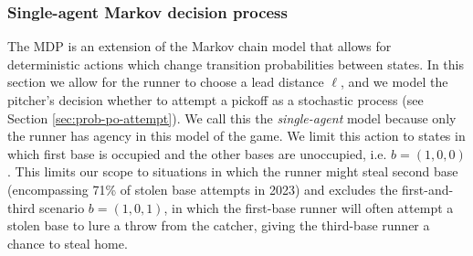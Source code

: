 \documentclass{article}
\begin{document}
 
      \subsubsection{Single-agent Markov decision process}
      \label{sec:single-agent-mdp}

        The MDP is an extension of the Markov chain model that allows for deterministic actions which change transition probabilities between states. In this section we allow for the runner to choose a lead distance $\ell$, and we model the pitcher's decision whether to attempt a pickoff as a stochastic process (see Section \ref{sec:prob-po-attempt}). We call this the {\it single-agent} model because only the runner has agency in this model of the game. We limit this action to states in which first base is occupied and the other bases are unoccupied, i.e. $b = (1, 0, 0)$. This limits our scope to situations in which the runner might steal second base (encompassing 71\% of stolen base attempts in 2023) and excludes the first-and-third scenario $b = (1, 0, 1)$, in which the first-base runner will often attempt a stolen base to lure a throw from the catcher, giving the third-base runner a chance to steal home.
     
\end{document}
